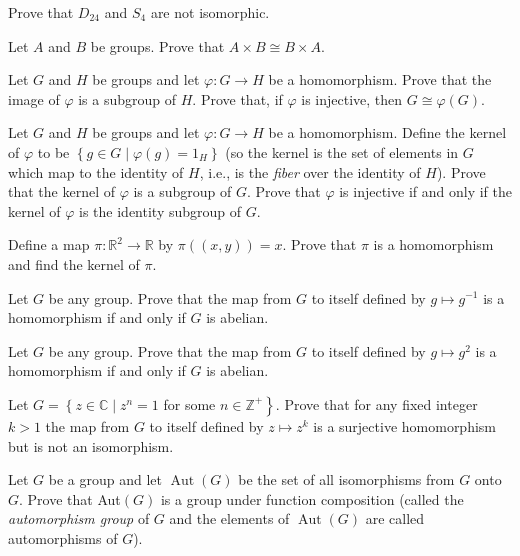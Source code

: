 \begin{questions}
\question
Prove that \(D_{24}\) and \(S_4\) are not isomorphic.



\question
Let \(A\) and \(B\) be groups. Prove that \(A \times B \cong B \times A\).


\question
Let \(G\) and \(H\) be groups and let \(\varphi: G \rightarrow H\) be a homomorphism. 
Prove that the image of \(\varphi\)  is a subgroup of \(H\).
Prove that, if \(\varphi\) is injective, then \(G \cong \varphi(G)\).


\question
Let \(G\) and \(H\) be groups and let \(\varphi: G \rightarrow H\) be a homomorphism. Define the kernel of \(\varphi\) to be \(\left\{g \in G \mid \varphi(g)=1_H\right\}\) (so the kernel is the set of elements in \(G\) which map to the identity of \(H\), i.e., is the \textit{fiber} over the identity of \(H\)). Prove that the kernel of \(\varphi\) is a subgroup   of \(G\). Prove that \(\varphi\) is injective if and only if the kernel of \(\varphi\) is the identity subgroup of \(G\).

\question
Define a map \(\pi: \mathbb{R}^2 \rightarrow \mathbb{R}\) by \(\pi((x, y))=x\). Prove that \(\pi\) is a homomorphism and find the kernel of \(\pi\).

\question
Let \(G\) be any group. Prove that the map from \(G\) to itself defined by \(g \mapsto g^{-1}\) is a homomorphism if and only if \(G\) is abelian.


\question
Let \(G\) be any group. Prove that the map from \(G\) to itself defined by \(g \mapsto g^2\) is a homomorphism if and only if \(G\) is abelian.

\question
Let \(G=\left\{z \in \mathbb{C} \mid z^n=1\right.\) for some \(\left.n \in \mathbb{Z}^{+}\right\}\). Prove that for any fixed integer \(k>1\) the map from \(G\) to itself defined by \(z \mapsto z^k\) is a surjective homomorphism but is not an isomorphism.




\question
Let \(G\) be a group and let \(\operatorname{Aut}(G)\) be the set of all isomorphisms from \(G\) onto \(G\). Prove that Aut\((G)\) is a group under function composition (called the \textit{automorphism group} of \(G\) and the elements of \(\operatorname{Aut}(G)\) are called automorphisms of \(G\)).










\end{questions}
